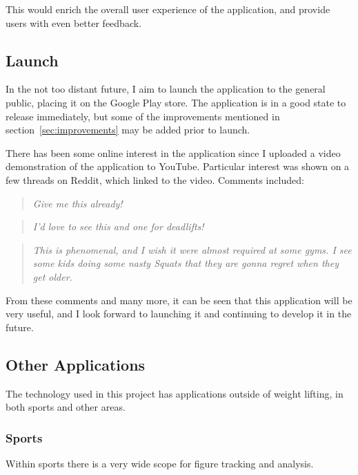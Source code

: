 This would enrich the overall user experience of the application, and provide users with even better feedback.

\subsection{Launch}

In the not too distant future, I aim to launch the application to the general public, placing it on the Google Play\cite{googleplay} store. The application is in a good state to release immediately, but some of the improvements mentioned in section~\ref{sec:improvements} may be added prior to launch.

There has been some online interest in the application since I uploaded a video demonstration of the application to YouTube\cite{youtube}. Particular interest was shown on a few threads on Reddit\cite{reddit}\cite{redditpopularity}, which linked to the video. Comments included:

\begin{quote}
\emph{Give me this already!}
\end{quote}

\begin{quote}
\emph{I'd love to see this and one for deadlifts!}
\end{quote}

\begin{quote}
\emph{This is phenomenal, and I wish it were almost required at some gyms. I see some kids doing some nasty Squats that they are gonna regret when they get older.}
\end{quote}

From these comments and many more, it can be seen that this application will be very useful, and I look forward to launching it and continuing to develop it in the future.

\subsection{Other Applications}

The technology used in this project has applications outside of weight lifting, in both sports and other areas.

\subsubsection{Sports}

Within sports there is a very wide scope for figure tracking and analysis.

